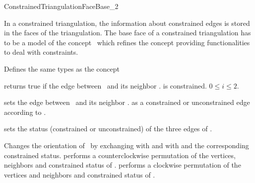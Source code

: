 

\begin{ccRefConcept}{ConstrainedTriangulationFaceBase_2}


\ccDefinition
  
In a constrained triangulation,
the information about constrained edges is stored in the 
faces of the triangulation.
The base face of a constrained triangulation
has to be a model of the concept
\ccRefName\ which  refines the concept
providing functionalities to deal with
constraints.

\ccRefines
{}

\ccTypes
Defines the same types as the  concept




{returns true if the edge between \ccVar\ and its neighbor 
\ccVar . is constrained.
\ccPrecond $0\leq i \leq 2$.}

\begin{ccAdvanced}
\ccModifiers
{}
{sets the edge between \ccVar\ and its neighbor \ccVar .
 as a constrained or unconstrained edge according to .}

{sets the status (constrained or unconstrained) of the three
edges of \ccVar.}

{Changes the orientation of \ccVar\ by exchanging 
with  and  with 
and the corresponding constrained status.}
{performs a counterclockwise permutation of the
 vertices, neighbors and constrained status of  \ccVar.}
{performs a clockwise permutation of the
 vertices and neighbors and constrained status of \ccVar.}




\end{ccAdvanced}
\end{ccRefConcept}
